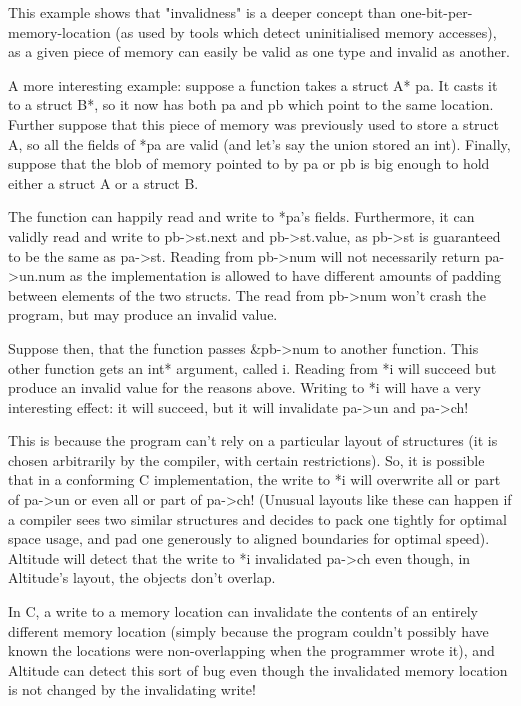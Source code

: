 \documentclass[10pt,a4paper]{report}
\begin{document}
This example shows that "invalidness" is a deeper concept than one-bit-per-memory-location (as used by tools which detect uninitialised memory accesses), as a given piece of memory can easily be valid as one type and invalid as another.

A more interesting example: suppose a function takes a struct A* pa. It casts it to a struct B*, so it now has both pa and pb which point to the same location. Further suppose that this piece of memory was previously used to store a struct A, so all the fields of *pa are valid (and let's say the union stored an int). Finally, suppose that the blob of memory pointed to by pa or pb is big enough to hold either a struct A or a struct B.

The function can happily read and write to *pa's fields. Furthermore, it can validly read and write to pb->st.next and pb->st.value, as pb->st is guaranteed to be the same as pa->st. Reading from pb->num will not necessarily return pa->un.num as the implementation is allowed to have different amounts of padding between elements of the two structs. The read from pb->num won't crash the program, but may produce an invalid value.

Suppose then, that the function passes &pb->num to another function. This other function gets an int* argument, called i. Reading from *i will succeed but produce an invalid value for the reasons above. Writing to *i will have a very interesting effect: it will succeed, but it will invalidate pa->un and pa->ch!

This is because the program can't rely on a particular layout of structures (it is chosen arbitrarily by the compiler, with certain restrictions). So, it is possible that in a conforming C implementation, the write to *i will overwrite all or part of pa->un or even all or part of pa->ch! (Unusual layouts like these can happen if a compiler sees two similar structures and decides to pack one tightly for optimal space usage, and pad one generously to aligned boundaries for optimal speed). Altitude will detect that the write to *i invalidated pa->ch even though, in Altitude's layout, the objects don't overlap.

In C, a write to a memory location can invalidate the contents of an entirely different memory location (simply because the program couldn't possibly have known the locations were non-overlapping when the programmer wrote it), and Altitude can detect this sort of bug even though the invalidated memory location is not changed by the invalidating write!
\end{document}
